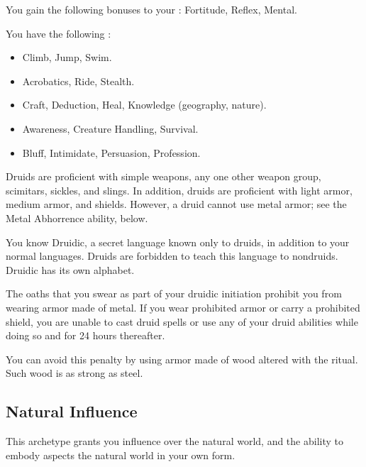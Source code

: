         You gain the following bonuses to your :  Fortitude,  Reflex,  Mental.

        You have the following :
        \begin{itemize}
            \item {} Climb, Jump, Swim.
            \item {} Acrobatics, Ride, Stealth.
            \item {} Craft, Deduction, Heal, Knowledge (geography, nature).
            \item {} Awareness, Creature Handling, Survival.
            \item {} Bluff, Intimidate, Persuasion, Profession.
        \end{itemize}

        Druids are proficient with simple weapons, any one other weapon group, scimitars, sickles, and slings.
        In addition, druids are proficient with light armor, medium armor, and shields.
        However, a druid cannot use metal armor; see the Metal Abhorrence ability, below.

        You know Druidic, a secret language known only to druids, in addition to your normal languages.
        Druids are forbidden to teach this language to nondruids.
        Druidic has its own alphabet.

        The oaths that you swear as part of your druidic initiation prohibit you from wearing armor made of metal.
        If you wear prohibited armor or carry a prohibited shield, you are unable to cast druid spells or use any of your  druid abilities while doing so and for 24 hours thereafter.

        You can avoid this penalty by using armor made of wood altered with the  ritual.
        Such wood is as strong as steel.

    \subsection{Natural Influence}
        This archetype grants you influence over the natural world, and the ability to embody aspects the natural world in your own form.

